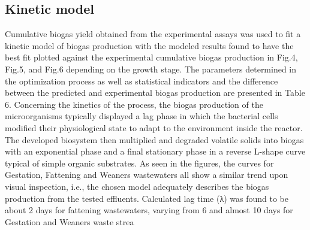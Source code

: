\subsection{Kinetic model}
Cumulative biogas yield obtained from the experimental assays was used to fit a kinetic model of biogas production with the modeled results found to have the best fit plotted against the experimental cumulative biogas production in Fig.4, Fig.5, and Fig.6 depending on the growth stage. The parameters determined in the optimization process as well as statistical indicators and the difference between the predicted and experimental biogas production are presented in Table 6.
Concerning the kinetics of the process, the biogas production of the microorganisms typically displayed a lag phase in which the bacterial cells modified their physiological state to adapt to the environment inside the reactor. The developed biosystem then multiplied and degraded volatile solids into biogas with an exponential phase and a final stationary phase in a reverse L-shape curve typical of simple organic substrates. As seen in the figures, the curves for Gestation, Fattening and Weaners wastewaters all show a similar trend upon visual inspection, i.e., the chosen model adequately describes the biogas production from the tested effluents. Calculated lag time (λ) was found to be about 2 days for fattening wastewaters, varying from 6 and almost 10 days for Gestation and Weaners waste strea